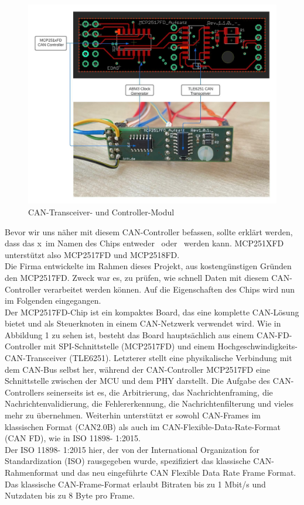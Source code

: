\begin{figure}[H]
	\begin{center}
		\includegraphics[width=1\textwidth]{./images/mcp_ic_phy.jpg}
	\end{center}
	\vspace{-5pt}
	\caption[CAN-Transceiver- und Controller-Modul]{CAN-Transceiver- und Controller-Modul} %
	\label{fig:can:controller:transciever}
	\vspace{-5pt}
\end{figure}
Bevor wir uns näher mit diesem CAN-Controller befassen, sollte erklärt werden, dass das \grqq x\grqq\ im Namen des Chips entweder \grqq\ oder \grqq\ werden kann. MCP251XFD unterstützt also MCP2517FD und MCP2518FD.\\
Die Firma entwickelte im Rahmen dieses Projekt, aus kostengünstigen Gründen den  MCP2517FD. Zweck war es, zu prüfen, wie schnell Daten mit diesem CAN-Controller verarbeitet werden können. Auf die Eigenschaften des Chips wird nun im Folgenden eingegangen.\\
Der MCP2517FD-Chip ist ein kompaktes Board, das eine komplette CAN-Lösung bietet und als Steuerknoten in einem CAN-Netzwerk verwendet wird. Wie in Abbildung 1 zu sehen ist, besteht das Board hauptsächlich aus einem CAN-FD-Controller mit SPI-Schnittstelle (MCP2517FD) und einem Hochgeschwindigkeits-CAN-Transceiver (TLE6251). Letzterer stellt eine physikalische Verbindung mit dem CAN-Bus selbst her, während der CAN-Controller MCP2517FD eine Schnittstelle zwischen der MCU und dem PHY darstellt. Die Aufgabe des CAN-Controllers seinerseits ist es, die Arbitrierung, das Nachrichtenframing, die Nachrichtenvalidierung, die Fehlererkennung, die Nachrichtenfilterung und vieles mehr zu übernehmen. Weiterhin unterstützt er sowohl CAN-Frames im klassischen Format (CAN2.0B) als auch im CAN-Flexible-Data-Rate-Format (CAN FD), wie in ISO 11898- 1:2015.\\
Der ISO 11898- 1:2015 hier, der von der International Organization for Standardization (ISO) rausgegeben wurde, spezifiziert das klassische CAN-Rahmenformat und das neu eingeführte CAN Flexible Data Rate Frame Format. Das klassische CAN-Frame-Format erlaubt Bitraten bis zu 1 Mbit/s und Nutzdaten bis zu 8 Byte pro Frame.

